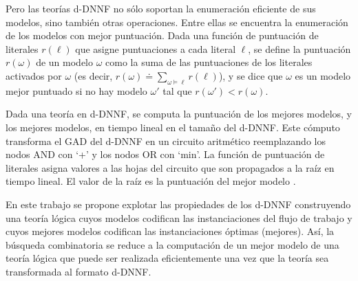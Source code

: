 Pero las teorías d-DNNF no sólo soportan la enumeración eficiente de sus
modelos, sino también otras operaciones. Entre ellas se encuentra la enumeración
de los modelos con mejor puntuación. Dada una función de puntuación de literales
$r(\ell)$ que asigne puntuaciones a cada literal $\ell$, se define la puntuación
$r(\omega)$ de un modelo $\omega$ como la suma de las puntuaciones de los literales
activados por $\omega$ (es decir,
$r(\omega)\doteq\sum_{\omega\vDash\ell}r(\ell)$), y se dice que $\omega$ es un modelo
mejor puntuado si no hay modelo $\omega'$ tal que $r(\omega')<r(\omega)$.

Dada una teoría en d-DNNF, se computa la puntuación de los mejores modelos, y
los mejores modelos, en tiempo lineal en el tamaño del d-DNNF. Este cómputo
transforma el GAD del d-DNNF en un circuito aritmético reemplazando los nodos
AND con `+' y los nodos OR con `min'. La función de puntuación de literales
asigna valores a las hojas del circuito que son propagados a la raíz en tiempo
lineal. El valor de la raíz es la puntuación del mejor modelo \cite{darwiche:weighted}.

En este trabajo se propone explotar las propiedades de los d-DNNF construyendo una
teoría lógica cuyos modelos codifican las instanciaciones del flujo de trabajo
y cuyos mejores modelos codifican las instanciaciones óptimas (mejores). Así, la
búsqueda combinatoria se reduce a la computación de un mejor modelo de una
teoría lógica que puede ser realizada eficientemente una vez que la teoría sea
transformada al formato d-DNNF.

